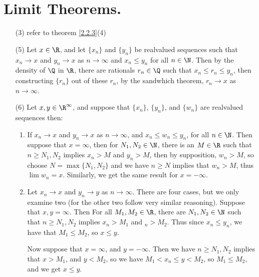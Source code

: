 
\section{Limit Theorems.}

\begin{enumerate}[label=(\arabic*)]
    \item[(3)] refer to theorem \ref{2.2.3}(4)

    \item[(5)] Let $x \in \R$, and let  $\{x_n\}$ and  $\{y_n\}$ be realvalued sequences 
    such that  $x_n \rightarrow x$ and  $y_n \rightarrow x$ as $n \rightarrow \infty$ and $x_n \leq y_n$ for all 
    $n \in \N$. Then by the density of  $\Q$ in  $\R$, there are rationals  $r_n \in \Q$ 
    such that  $x_n \leq r_n \leq y_n$, then constructing  $\{r_n\}$ out of these 
     $r_n$, by the sandwhich theorem,  $r_n \rightarrow x$ as  $n \rightarrow \infty$.

 \item[(6)] Let $x,y \in \R^\infty$, and suppose that $\{x_n\}$, $\{y_n\}$, and $\{w_n\}$ 
 are realvalued sequences then:
     \begin{enumerate}
         \item If $x_n \rightarrow x$ and  $y_n \rightarrow x$ as  $n \rightarrow \infty$, and  $x_n \leq w_n \leq y_n$, 
        for all  $n \in \N$. Then suppose that $x=\infty$, then for $N_1,N_2 \in \N$, 
        there is an  $M \in \R$ such that  $n \geq N_1,N_2$ implies $x_n>M$ and 
        $y_n>M$, then by supposition,  $w_n>M$, so choose  $N=\max\{N_1,N_2\}$ and 
        we have $n \geq N$ implies that $w_n>M$, thus  $\lim{w_n}=x$. Similarly, 
        we get the same result for  $x=-\infty$.

        \item Let $x_n \rightarrow x$ and  $y_n \rightarrow y$ as  $n \rightarrow \infty$. There are four cases, but we 
        only examine two (for the other two follow very similar reasoning). Suppose 
        that $x,y=\infty$. Then For all  $M_1,M_2 \in \R$, there are $N_1,N_2 \in \N$ 
        such that $n \geq N_1,N_2$ implies $x_n>M_1$ and $_n>M_2$. Thus since $x_n \leq y_n$, 
        we have that  $M_1 \leq M_2$, so $x \leq y$.

        Now suppose that  $x=\infty$, and  $y=-\infty$. Then we have  $n \geq N_1,N_2$ implies 
        that $x>M_1$, and $y<M_2$, so we have $M_1<x_n \leq y<M_2$, so $M_1 \leq M_2$, 
        and we get $x \leq y$.
     \end{enumerate}
\end{enumerate}
